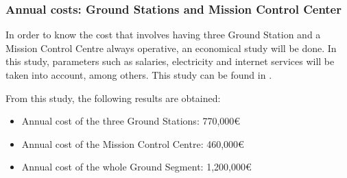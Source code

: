 \subsubsection{Annual costs: Ground Stations and Mission Control Center}
In order to know the cost that involves having three Ground Station and a Mission Control Centre always operative, an economical study will be done. In this study, parameters such as salaries, electricity and internet services will be taken into account, among others. This study can be found in \cite[Chapter 3, Section 2]{annex3}.

From this study, the following results are obtained:
\begin{itemize}
\item Annual cost of the three Ground Stations: 770,000\euro
\item Annual cost of the Mission Control Centre: 460,000\euro
\item Annual cost of the whole Ground Segment: 1,200,000\euro
\end{itemize}